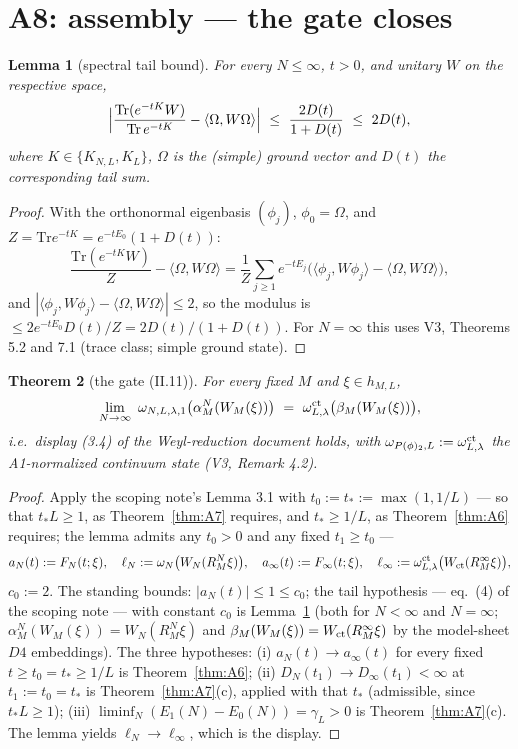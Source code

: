 \documentclass[11pt,a4paper]{article}
\theoremstyle{plain}
\newtheorem{theorem}{Theorem}[section]
\newtheorem{lemma}[theorem]{Lemma}
\theoremstyle{definition}
\newcommand{\ip}[2]{\langle #1,#2\rangle}
\newcommand{\Trace}{\mathrm{Tr}}
\begin{document}
\section{A8: assembly --- the gate closes}\label{sec:A8}

\begin{lemma}[spectral tail bound]\label{lem:tail}
For every $N\le\infty$, $t>0$, and unitary $W$ on the respective space,
\[
 \Bigl|\frac{\Trace(e^{-tK}W)}{\Trace\,e^{-tK}}
 -\ip{\Omega}{W\Omega}\Bigr|
 \ \le\ \frac{2D(t)}{1+D(t)}\ \le\ 2D(t),
\]
where $K\in\{K_{N,L},K_L\}$, $\Omega$ is the (simple) ground vector and
$D(t)$ the corresponding tail sum.
\end{lemma}

\begin{proof}
With the orthonormal eigenbasis $(\phi_j)$, $\phi_0=\Omega$, and
$Z=\Trace e^{-tK}=e^{-tE_0}(1+D(t))$:
\[
 \frac{\Trace(e^{-tK}W)}Z-\ip\Omega{W\Omega}
 =\frac1Z\sum_{j\ge1}e^{-tE_j}
 \bigl(\ip{\phi_j}{W\phi_j}-\ip\Omega{W\Omega}\bigr),
\]
and $|\ip{\phi_j}{W\phi_j}-\ip\Omega{W\Omega}|\le2$, so the modulus is
$\le2e^{-tE_0}D(t)/Z=2D(t)/(1+D(t))$. For $N=\infty$ this uses V3,
Theorems 5.2 and 7.1 (trace class; simple ground state).
\end{proof}

\begin{theorem}[the gate (II.11)]\label{thm:gate}
For every fixed $M$ and $\xi\in h_{M,L}$,
\[
 \lim_{N\to\infty}\ \omega_{N,L,\lambda,1}
 \bigl(\alpha_M^N(W_M(\xi))\bigr)
 \ =\ \omega^{\rm ct}_{L,\lambda}\bigl(\beta_M(W_M(\xi))\bigr),
\]
i.e.\ display (3.4) of the Weyl-reduction document holds, with
$\omega_{P(\phi)_2,L}:=\omega^{\rm ct}_{L,\lambda}$ the A1-normalized
continuum state (V3, Remark 4.2).
\end{theorem}

\begin{proof}
Apply the scoping note's Lemma 3.1 with
$t_0:=t_*:=\max(1,1/L)$ --- so that $t_*L\ge1$, as Theorem~\ref{thm:A7} requires, and
$t_*\ge1/L$, as Theorem~\ref{thm:A6} requires; the lemma admits any $t_0>0$ and any
fixed $t_1\ge t_0$ ---
\[
 a_N(t):=F_N(t;\xi),\quad
 \ell_N:=\omega_N\bigl(W_N(R_M^N\xi)\bigr),\quad
 a_\infty(t):=F_\infty(t;\xi),\quad
 \ell_\infty:=\omega^{\rm ct}_{L,\lambda}
 \bigl(W_{\rm ct}(R_M^\infty\xi)\bigr),
\]
$c_0:=2$. The standing bounds: $|a_N(t)|\le1\le c_0$; the tail
hypothesis --- eq.\ (4) of the scoping note --- with constant $c_0$ is
Lemma~\ref{lem:tail}
(both for $N<\infty$ and $N=\infty$; $\alpha_M^N(W_M(\xi))=W_N(R_M^N\xi)$
and $\beta_M(W_M(\xi))=W_{\rm ct}(R_M^\infty\xi)$ by the model-sheet
$D4$ embeddings). The three hypotheses:
(i) $a_N(t)\to a_\infty(t)$ for every fixed $t\ge t_0=t_*\ge1/L$ is
Theorem~\ref{thm:A6};
(ii) $D_N(t_1)\to D_\infty(t_1)<\infty$ at $t_1:=t_0=t_*$ is
Theorem~\ref{thm:A7}(c), applied with that $t_*$ (admissible, since
$t_*L\ge1$);
(iii) $\liminf_N(E_1(N)-E_0(N))=\gamma_L>0$ is Theorem~\ref{thm:A7}(c).
The lemma yields $\ell_N\to\ell_\infty$, which is the display.
\end{proof}
\end{document}
